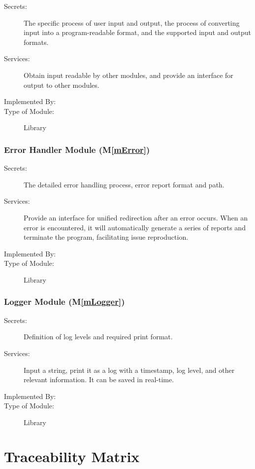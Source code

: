 \documentclass[12pt, titlepage]{article}
\newcommand{\mref}[1]{M\ref{#1}}
\begin{document}
\begin{description}
\item[Secrets:]The specific process of user input and output, the process of
converting input into a program-readable format, and the supported input and
output formats.
\item[Services:]Obtain input readable by other modules, and provide an interface
for output to other modules.
\item[Implemented By:] \progname
\item[Type of Module:] Library
\end{description}

\subsubsection{Error Handler Module (\mref{mError})}

\begin{description}
\item[Secrets:]The detailed error handling process, error report format and
path.
\item[Services:]Provide an interface for unified redirection after an error
occurs.  When an error is encountered, it will automatically generate a series
of reports and terminate the program, facilitating issue reproduction.
\item[Implemented By:] \progname
\item[Type of Module:] Library
\end{description}

\subsubsection{Logger Module (\mref{mLogger})}

\begin{description}
\item[Secrets:]Definition of log levels and required print format.
\item[Services:]Input a string, print it as a log with a timestamp, log level,
and other relevant information.  It can be saved in real-time.
\item[Implemented By:] \progname
\item[Type of Module:] Library
\end{description}

\section{Traceability Matrix} \label{SecTM}
\end{document}
